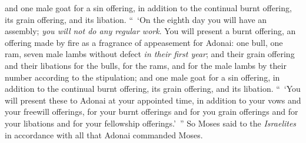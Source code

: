 \begin{biblechapter}
\verse and one male goat for a sin offering, in addition to the continual burnt offering, its grain offering, and its libation.
\verse “ ‘On the eighth day you will have an assembly; \textit{you will not do any regular work}.
\verse You will present a burnt offering, an offering made by fire as a fragrance of appeasement for Adonai: one bull, one ram, seven male lambs without defect \textit{in their first year};
\verse and their grain offering and their libations for the bulls, for the rams, and for the male lambs by their number according to the stipulation;
\verse and one male goat for a sin offering, in addition to the continual burnt offering, its grain offering, and its libation.
\verse “ ‘You will present these to Adonai at your appointed time, in addition to your vows and your freewill offerings, for your burnt offerings and for you grain offerings and for your libations and for your fellowship offerings.’ ”
\verse {} So Moses said to the \textit{Israelites} in accordance with all that Adonai commanded Moses.
\end{biblechapter}

